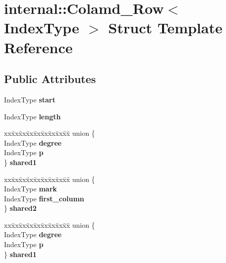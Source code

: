 \hypertarget{structinternal_1_1_colamd___row}{}\section{internal\+:\+:Colamd\+\_\+\+Row$<$ Index\+Type $>$ Struct Template Reference}
\label{structinternal_1_1_colamd___row}
\subsection*{Public Attributes}
\begin{DoxyCompactItemize}
\item 
\mbox{\label{structinternal_1_1_colamd___row_ac6998584d9ff3a7eae40b632b0e63b43}} 
Index\+Type {\bfseries start}
\item 
\mbox{\label{structinternal_1_1_colamd___row_a061b6aba0ec750f7183a6ad248be7be6}} 
Index\+Type {\bfseries length}
\item 
\mbox{\label{structinternal_1_1_colamd___row_a006f6dafce1c82863442b6bac6612ff1}} 
\begin{tabbing}
xx\=xx\=xx\=xx\=xx\=xx\=xx\=xx\=xx\=\kill
union \{\\
\>IndexType {\bfseries degree}\\
\>IndexType {\bfseries p}\\
\} {\bfseries shared1}\\

\end{tabbing}\item 
\mbox{\label{structinternal_1_1_colamd___row_a9d47e9d83f6a7c469a9ae129ed85aa8e}} 
\begin{tabbing}
xx\=xx\=xx\=xx\=xx\=xx\=xx\=xx\=xx\=\kill
union \{\\
\>IndexType {\bfseries mark}\\
\>IndexType {\bfseries first\_column}\\
\} {\bfseries shared2}\\

\end{tabbing}\item 
\mbox{\label{structinternal_1_1_colamd___row_a6720067c5db00365dcf1ecd681bf0dd2}} 
\begin{tabbing}
xx\=xx\=xx\=xx\=xx\=xx\=xx\=xx\=xx\=\kill
union \{\\
\>IndexType {\bfseries degree}\\
\>IndexType {\bfseries p}\\
\} {\bfseries shared1}\\


\end{tabbing}
\end{DoxyCompactItemize}
